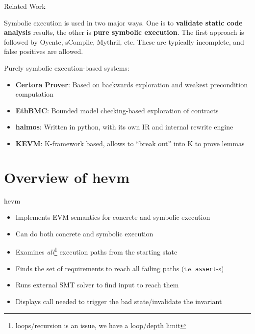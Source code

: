 \documentclass[aspectratio=169]{beamer}
\begin{document}
\begin{frame}{Related Work}

Symbolic execution is used in two major ways. One is to \textbf{validate static code analysis} results, the other is \textbf{pure symbolic execution}. The first approach is followed by Oyente, sCompile, Mythril, etc. These are typically incomplete, and false positives are allowed.

\bigskip

Purely symbolic execution-based systems:
\begin{itemize}
\item \textbf{Certora Prover}: Based on backwards exploration and weakest precondition computation
\item \textbf{EthBMC}: Bounded model checking-based exploration of contracts
\item \textbf{halmos}: Written in python, with its own IR and internal rewrite engine
\item \textbf{KEVM}: K-framework based, allows to ``break out'' into K to prove lemmas
\end{itemize}
\end{frame}


\section{Overview of hevm}
\begin{frame}{hevm}
\begin{itemize}
\item Implements EVM semantics for concrete and symbolic execution
\item Can do both concrete and symbolic execution
\item Examines \emph{all}\footnote{loops/recursion is an issue, we have a loop/depth limit} execution paths from the starting state
\item Finds the set of requirements to reach all failing paths (i.e. \texttt{assert}-s)
\item Runs external SMT solver to find input to reach them
\item Displays call needed to trigger the bad state/invalidate the invariant
\end{itemize}
\end{frame}


%
%
%
\end{document}
